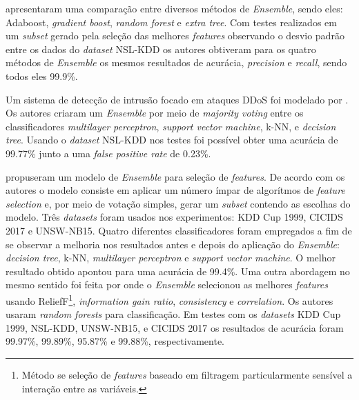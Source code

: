  apresentaram uma comparação entre diversos métodos de \textit{Ensemble}, sendo eles: Adaboost, \textit{gradient boost}, \textit{random forest} e \textit{extra tree}. Com testes realizados em um \textit{subset} gerado pela seleção das melhores \textit{features} observando o desvio padrão entre os dados do \textit{dataset} NSL-KDD os autores obtiveram para os quatro métodos de \textit{Ensemble} os mesmos resultados de acurácia, \textit{precision} e \textit{recall}, sendo todos eles 99.9\%.

Um sistema de detecção de intrusão focado em ataques DDoS foi modelado por . Os autores criaram um \textit{Ensemble} por meio de \textit{majority voting} entre os classificadores \textit{multilayer perceptron}, \textit{support vector machine}, k-NN, e \textit{decision tree}. Usando o \textit{dataset} NSL-KDD nos testes foi possível obter uma acurácia de 99.77\% junto a uma \textit{false positive rate} de 0.23\%.

 propuseram um modelo de \textit{Ensemble} para seleção de \textit{features}. De acordo com os autores o modelo consiste em aplicar um número ímpar de algorítmos de \textit{feature selection} e, por meio de votação simples, gerar um \textit{subset} contendo as escolhas do modelo. Três \textit{datasets} foram usados nos experimentos: KDD Cup 1999, CICIDS 2017 e UNSW-NB15. Quatro diferentes classificadores foram empregados a fim de se observar a melhoria nos resultados antes e depois do aplicação do \textit{Ensemble}: \textit{decision tree}, k-NN, \textit{multilayer perceptron} e \textit{support vector machine}. O melhor resultado obtido apontou para uma acurácia de 99.4\%. Uma outra abordagem no mesmo sentido foi feita por  onde o \textit{Ensemble} selecionou as melhores \textit{features} usando ReliefF\footnote{Método se seleção de \textit{features} baseado em filtragem particularmente sensível a interação entre as variáveis.}, \textit{information gain ratio}, \textit{consistency} e \textit{correlation}. Os autores usaram \textit{random forests} para classificação. Em testes com os \textit{datasets} KDD Cup 1999, NSL-KDD, UNSW-NB15, e CICIDS 2017 os resultados de acurácia foram 99.97\%, 99.89\%, 95.87\% e 99.88\%, respectivamente.



